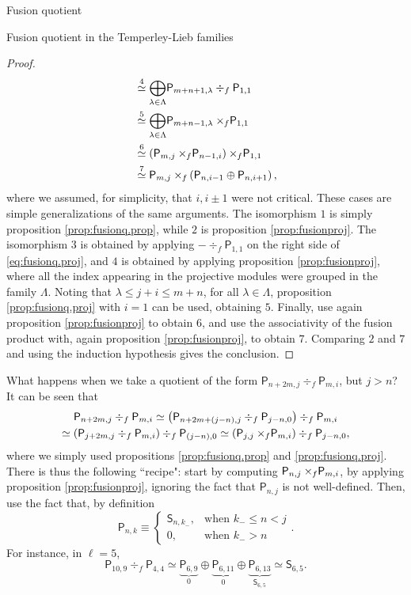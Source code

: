 \documentclass[reqno]{amsart}
\newcommand{\ds}[1]{\mathsf S_{#1}}
\newcommand{\dP}[1]{\mathsf P_{#1}}
\newcommand{\xf}{\times\hspace{-0.27em}_f}
\begin{document}
\begin{section}{Fusion quotient}
\begin{subsection}{Fusion quotient in the Temperley-Lieb families}
\begin{proof}
\begin{align*}
	&\overset{4}{\simeq}  \underset{\lambda \in \Lambda}{\bigoplus} \dP{m+n+1,\lambda} \div_{f} \dP{1,1}\\
	&\overset{5}{\simeq} \underset{\lambda \in \Lambda}{\bigoplus} \dP{m+n-1,\lambda} \xf \dP{1,1}\\
	&\overset{6}{\simeq} \left(\dP{m,j}\xf \dP{n-1,i} \right)\xf \dP{1,1}\\
	&\overset{7}{\simeq} \dP{m,j} \xf \left(\dP{n,i-1} \oplus \dP{n,i+1}\right),
\end{align*}
where we assumed, for simplicity, that $i, i\pm 1$ were not critical. These cases are simple generalizations of the same arguments. The isomorphism $1$ is simply proposition \ref{prop:fusionq.prop}, while $2$ is proposition \ref{prop:fusionproj}. The isomorphism $3$ is obtained by applying $- \div_{f} \dP{1,1}$ on the right side of \eqref{eq:fusionq.proj}, and $4$ is obtained by applying proposition \ref{prop:fusionproj}, where all the index appearing in the projective modules were grouped in the family $\Lambda$. Noting that $\lambda \leq j+i \leq m+n$, for all $\lambda \in \Lambda$, proposition \ref{prop:fusionq.proj} with $i=1$ can be used, obtaining $5$. Finally, use again proposition \ref{prop:fusionproj} to obtain $6$, and use the associativity of the fusion product with, again proposition \ref{prop:fusionproj}, to obtain $7$. Comparing $2$ and $7$ and using the induction hypothesis gives the conclusion.
\end{proof}
What happens when we take a quotient of the form $\dP{n+2m,j} \div_{f} \dP{m,i}$, but $j>n$? It can be seen that
\begin{multline}
\dP{n+2m,j}\div_{f} \dP{m,i} \simeq \left(\dP{n+2m+(j-n),j} \div_{f} \dP{j-n,0}  \right)\div_{f} \dP{m,i} \\
\simeq \left( \dP{j+2m,j} \div_{f} \dP{m,i}\right) \div_{f} \dP{(j-n),0} \simeq \left(\dP{j,j} \xf \dP{m,i} \right)\div_{f} \dP{j-n,0},
\end{multline}
where we simply used propositions \ref{prop:fusionq.prop} and \ref{prop:fusionq.proj}. There is thus the following ``recipe": start by computing $\dP{n,j} \xf \dP{m,i}$, by applying proposition \ref{prop:fusionproj}, ignoring the fact that $\dP{n,j}$ is not well-defined. Then, use the fact that, by definition
\begin{equation*}
\dP{n,k} \equiv \begin{cases}
\ds{n,k_{-}}, & \text{when } k_{-}\leq n< j\\
0, & \text{when } k_{-}>n
\end{cases}.
\end{equation*}
For instance, in $\ell =5$,
$$\dP{10,9} \div_{f} \dP{4,4} \simeq \underbrace{\dP{6,9}}_{0} \oplus \underbrace{\dP{6,11}}_{0} \oplus \underbrace{\dP{6,13}}_{\ds{6,5}} \simeq \ds{6,5}.$$


\end{subsection}
\end{section}
\end{document}
